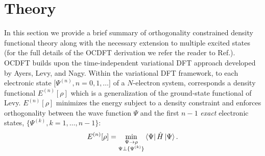 \documentclass[12pt]{article}
\newcommand{\bra}[2][0]
{\ifthenelse{\equal{#1}{0}}{\left\langle #2 \right|}
{\ifthenelse{\equal{#1}{1}}{\big\langle #2 \big|}
{\ifthenelse{\equal{#1}{2}}{\Big\langle #2 \Big|}
{\ifthenelse{\equal{#1}{3}}{\bigg\langle #2 \bigg|}
{\ifthenelse{\equal{#1}{4}}{\Bigg\langle #2 \Bigg|}
{Error}}}}}
}
\newcommand{\ket}[2][0]
{\ifthenelse{\equal{#1}{0}}{\left| #2 \right\rangle}
{\ifthenelse{\equal{#1}{1}}{\big| #2 \big\rangle}
{\ifthenelse{\equal{#1}{2}}{\Big| #2 \Big\rangle}
{\ifthenelse{\equal{#1}{3}}{\bigg| #2 \bigg\rangle}
{\ifthenelse{\equal{#1}{4}}{\Bigg| #2 \Bigg\rangle}
{Error}}}}}
}
\begin{document}
\section{Theory}
In this section we provide a brief summary of orthogonality constrained density functional theory along with the necessary extension to multiple excited states (for the full details of the OCDFT derivation we refer the reader to Ref.).
OCDFT builds upon the time-independent variational DFT approach developed by Ayers, Levy, and Nagy.\cite{ayers_time-independent_2012}
Within the variational DFT framework, to each electronic state [$\Psi^{(n)}, n=0,1,\ldots$] of a $N$-electron system, corresponds a density functional $E^{(n)}[\rho]$ which is a generalization of the ground-state functional of Levy.   $E^{(n)}[\rho]$ minimizes the energy subject to a density constraint and enforces orthogonality between the wave function $\Psi$ and the first $n-1$ \textit{exact} electronic states, $\{\Psi^{(k)}, k = 1,\ldots,n-1\}$:
\begin{equation}
E^{(n)}[\rho] = \min_{
\substack{
\Psi \rightarrow \rho\\
\Psi\bot \{\Psi^{(k)}\}
}
}
\bra{\Psi}\hat{H}\ket{\Psi}.
\end{equation}
\end{document}
